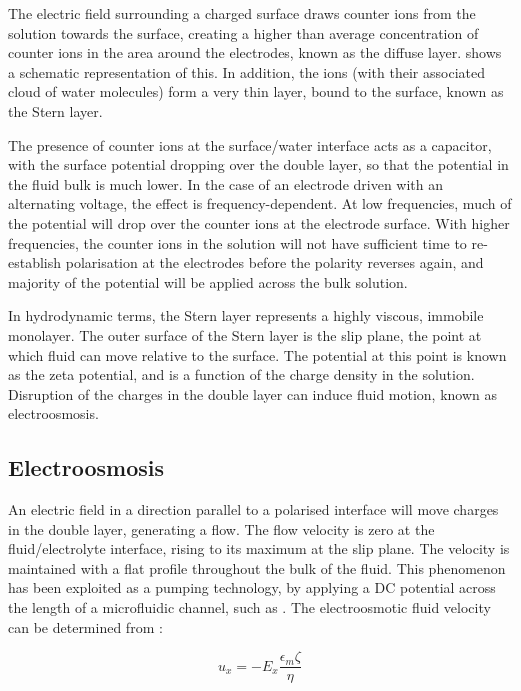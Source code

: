 The electric field surrounding a charged surface draws counter ions from the solution towards the surface, creating a higher than average concentration of counter ions in the area around the electrodes, known as the diffuse layer.  shows a schematic representation of this. In addition, the ions (with their associated cloud of water molecules) form a very thin layer, bound to the surface, known as the Stern layer.

The presence of counter ions at the surface/water interface acts as a capacitor, with the surface potential dropping over the double layer, so that the potential in the fluid bulk is much lower. In the case of an electrode driven with an alternating voltage, the effect is frequency-dependent. At low frequencies, much of the potential will drop over the counter ions at the electrode surface. With higher frequencies, the counter ions in the solution will not have sufficient time to re-establish polarisation at the electrodes before the polarity reverses again, and majority of the potential will be applied across the bulk solution.

In hydrodynamic terms, the Stern layer represents a highly viscous, immobile monolayer. The outer surface of the Stern layer is the slip plane, the point at which fluid can move relative to the surface. The potential at this point is known as the zeta potential, and is a function of the charge density in the solution. Disruption of the charges in the double layer can induce fluid motion, known as electroosmosis.

\subsection{Electroosmosis}
An electric field in a direction parallel to a polarised interface will move charges in the double layer, generating a flow. The flow velocity is zero at the fluid/electrolyte interface, rising to its maximum at the slip plane. The velocity is maintained with a flat profile throughout the bulk of the fluid. This phenomenon has been exploited as a pumping technology, by applying a DC potential across the length of a microfluidic channel, such as \cite{Fu:1999,Dittrich:2003}. The electroosmotic fluid velocity can be determined from  \citep{Morgan:2003}:

\begin{equation}
 u_{x} = -E_{x} \frac{\epsilon_{m} \zeta}{\eta}
\label{eqn:electroosmotic_velocity}
\end{equation}

